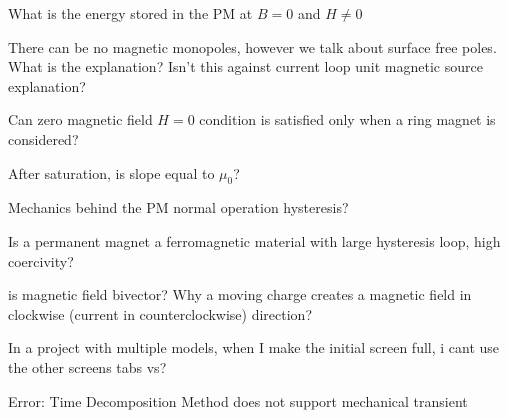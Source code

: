 
What is the energy stored in the PM at $B=0$ and $H \neq 0$

There can be no magnetic monopoles, however we talk about surface free poles. What is the explanation? Isn't this against current loop unit magnetic source explanation?


Can zero magnetic field $H=0$ condition is satisfied only when a ring magnet is considered?


After saturation, is slope equal to $\mu_{0}$?


Mechanics behind the PM normal operation hysteresis?

Is a permanent magnet a ferromagnetic material with large hysteresis loop, high coercivity?


is magnetic field bivector? Why a moving charge creates a magnetic field in clockwise (current in counterclockwise) direction?


In a project with multiple models, when I make the initial screen full, i cant use the other screens tabs vs?

Error: Time Decomposition Method does not support mechanical transient